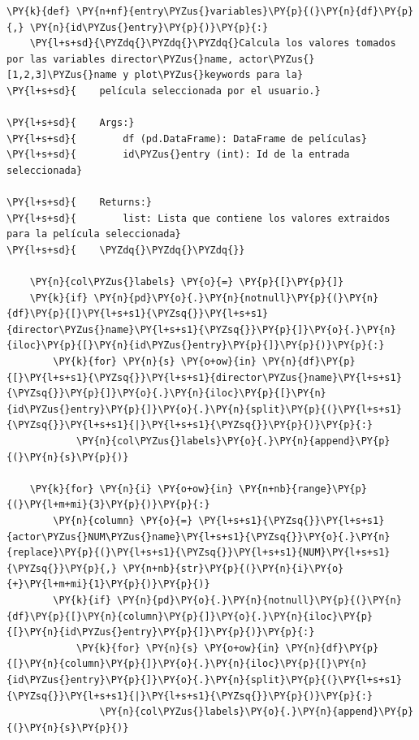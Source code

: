     \begin{tcolorbox}[breakable, size=fbox, boxrule=1pt, pad at break*=1mm,colback=cellbackground, colframe=cellborder]
\begin{Verbatim}[commandchars=\\\{\}]
\PY{k}{def} \PY{n+nf}{entry\PYZus{}variables}\PY{p}{(}\PY{n}{df}\PY{p}{,} \PY{n}{id\PYZus{}entry}\PY{p}{)}\PY{p}{:} 
    \PY{l+s+sd}{\PYZdq{}\PYZdq{}\PYZdq{}Calcula los valores tomados por las variables director\PYZus{}name, actor\PYZus{}[1,2,3]\PYZus{}name y plot\PYZus{}keywords para la}
\PY{l+s+sd}{    película seleccionada por el usuario.}

\PY{l+s+sd}{    Args:}
\PY{l+s+sd}{        df (pd.DataFrame): DataFrame de películas}
\PY{l+s+sd}{        id\PYZus{}entry (int): Id de la entrada seleccionada}

\PY{l+s+sd}{    Returns:}
\PY{l+s+sd}{        list: Lista que contiene los valores extraidos para la película seleccionada}
\PY{l+s+sd}{    \PYZdq{}\PYZdq{}\PYZdq{}}
    
    \PY{n}{col\PYZus{}labels} \PY{o}{=} \PY{p}{[}\PY{p}{]}    
    \PY{k}{if} \PY{n}{pd}\PY{o}{.}\PY{n}{notnull}\PY{p}{(}\PY{n}{df}\PY{p}{[}\PY{l+s+s1}{\PYZsq{}}\PY{l+s+s1}{director\PYZus{}name}\PY{l+s+s1}{\PYZsq{}}\PY{p}{]}\PY{o}{.}\PY{n}{iloc}\PY{p}{[}\PY{n}{id\PYZus{}entry}\PY{p}{]}\PY{p}{)}\PY{p}{:}
        \PY{k}{for} \PY{n}{s} \PY{o+ow}{in} \PY{n}{df}\PY{p}{[}\PY{l+s+s1}{\PYZsq{}}\PY{l+s+s1}{director\PYZus{}name}\PY{l+s+s1}{\PYZsq{}}\PY{p}{]}\PY{o}{.}\PY{n}{iloc}\PY{p}{[}\PY{n}{id\PYZus{}entry}\PY{p}{]}\PY{o}{.}\PY{n}{split}\PY{p}{(}\PY{l+s+s1}{\PYZsq{}}\PY{l+s+s1}{|}\PY{l+s+s1}{\PYZsq{}}\PY{p}{)}\PY{p}{:}
            \PY{n}{col\PYZus{}labels}\PY{o}{.}\PY{n}{append}\PY{p}{(}\PY{n}{s}\PY{p}{)}
            
    \PY{k}{for} \PY{n}{i} \PY{o+ow}{in} \PY{n+nb}{range}\PY{p}{(}\PY{l+m+mi}{3}\PY{p}{)}\PY{p}{:}
        \PY{n}{column} \PY{o}{=} \PY{l+s+s1}{\PYZsq{}}\PY{l+s+s1}{actor\PYZus{}NUM\PYZus{}name}\PY{l+s+s1}{\PYZsq{}}\PY{o}{.}\PY{n}{replace}\PY{p}{(}\PY{l+s+s1}{\PYZsq{}}\PY{l+s+s1}{NUM}\PY{l+s+s1}{\PYZsq{}}\PY{p}{,} \PY{n+nb}{str}\PY{p}{(}\PY{n}{i}\PY{o}{+}\PY{l+m+mi}{1}\PY{p}{)}\PY{p}{)}
        \PY{k}{if} \PY{n}{pd}\PY{o}{.}\PY{n}{notnull}\PY{p}{(}\PY{n}{df}\PY{p}{[}\PY{n}{column}\PY{p}{]}\PY{o}{.}\PY{n}{iloc}\PY{p}{[}\PY{n}{id\PYZus{}entry}\PY{p}{]}\PY{p}{)}\PY{p}{:}
            \PY{k}{for} \PY{n}{s} \PY{o+ow}{in} \PY{n}{df}\PY{p}{[}\PY{n}{column}\PY{p}{]}\PY{o}{.}\PY{n}{iloc}\PY{p}{[}\PY{n}{id\PYZus{}entry}\PY{p}{]}\PY{o}{.}\PY{n}{split}\PY{p}{(}\PY{l+s+s1}{\PYZsq{}}\PY{l+s+s1}{|}\PY{l+s+s1}{\PYZsq{}}\PY{p}{)}\PY{p}{:}
                \PY{n}{col\PYZus{}labels}\PY{o}{.}\PY{n}{append}\PY{p}{(}\PY{n}{s}\PY{p}{)}
                

\end{Verbatim}
\end{tcolorbox}
